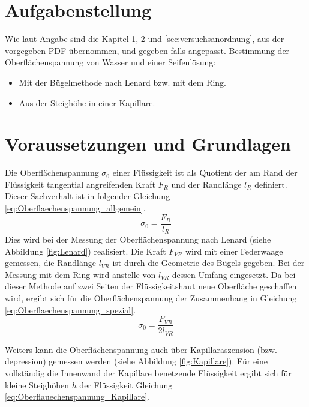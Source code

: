 \documentclass[11pt]{scrartcl}
\begin{document}

\tableofcontents
\newpage
\section{Aufgabenstellung}
\label{sec:aufgabenstellung}
Wie laut Angabe sind die Kapitel \ref{sec:aufgabenstellung}, \ref{sec:voraussetzungen_grundlagen} und \ref{sec:versuchsanordnung}, aus der vorgegeben PDF \cite{2012ObeflacheVorgabe} übernommen, und gegeben falls angepasst.
Bestimmung der Oberflächenspannung von Wasser und einer Seifenlösung:
\begin{itemize}
    \item Mit der Bügelmethode nach Lenard bzw. mit dem Ring. 
    \item Aus der Steighöhe in einer Kapillare.
\end{itemize}
\section{Voraussetzungen und Grundlagen}
\label{sec:voraussetzungen_grundlagen}
Die Oberflächenspannung $\sigma_0$ einer Flüssigkeit ist als Quotient der am Rand der Flüssigkeit tangential angreifenden Kraft $F_R$ und der Randlänge $l_R$ definiert.
Dieser Sachverhalt ist in folgender Gleichung \ref{eq:Oberflaechenspannung_allgemein}.
\begin{equation}
    \label{eq:Oberflaechenspannung_allgemein}
    \sigma_0 = \frac{F_R}{l_R}
\end{equation}
Dies wird bei der Messung der Oberflächenspannung nach Lenard (siehe Abbildung \ref{fig:Lenard}) realisiert. Die Kraft $F_{VR}$ wird mit einer Federwaage gemessen, die Randlänge
$l_{VR}$ ist durch die Geometrie des Bügels gegeben. Bei der Messung mit dem Ring wird anstelle von $l_{VR}$ dessen Umfang eingesetzt. Da bei dieser Methode auf zwei Seiten der Flüssigkeitshaut
neue Oberfläche geschaffen wird, ergibt sich für die Oberflächenspannung der Zusammenhang in Gleichung \ref{eq:Oberflaechenspannung_spezial}.
\begin{equation}
    \label{eq:Oberflaechenspannung_spezial}
    \sigma_0 = \frac{F_{VR}}{2l_{VR}}
\end{equation}

Weiters kann die Oberflächenspannung auch über Kapillaraszension (bzw. -depression) gemessen werden (siehe Abbildung \ref{fig:Kapillare}). Für eine vollständig die Innenwand der Kapillare
benetzende Flüssigkeit ergibt sich für kleine Steighöhen $h$ der Flüssigkeit Gleichung \ref{eq:Oberflauechenspannung_Kapillare}.
\end{document}

